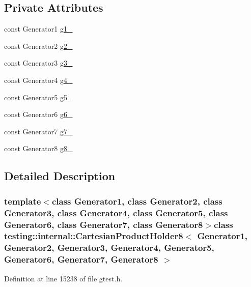 \subsection*{\-Private \-Attributes}
\begin{DoxyCompactItemize}
\item 
const \-Generator1 \hyperlink{classtesting_1_1internal_1_1CartesianProductHolder8_a36a04c8f9e515291d6a093ab378084f7}{g1\-\_\-}
\item 
const \-Generator2 \hyperlink{classtesting_1_1internal_1_1CartesianProductHolder8_a6cfd9fa9a396d07747d5ebb1f05c7f22}{g2\-\_\-}
\item 
const \-Generator3 \hyperlink{classtesting_1_1internal_1_1CartesianProductHolder8_a79088ad1a5d8e0e316bd20057b9cfb3f}{g3\-\_\-}
\item 
const \-Generator4 \hyperlink{classtesting_1_1internal_1_1CartesianProductHolder8_afdb77af6126bc058715b1304ec0cc727}{g4\-\_\-}
\item 
const \-Generator5 \hyperlink{classtesting_1_1internal_1_1CartesianProductHolder8_ac153ca256cc6aabca132e9276e0b7e80}{g5\-\_\-}
\item 
const \-Generator6 \hyperlink{classtesting_1_1internal_1_1CartesianProductHolder8_ac5367ac6ea4b99933483d6181bace5c2}{g6\-\_\-}
\item 
const \-Generator7 \hyperlink{classtesting_1_1internal_1_1CartesianProductHolder8_afceade55d34273936f6cb3d7e4833d1b}{g7\-\_\-}
\item 
const \-Generator8 \hyperlink{classtesting_1_1internal_1_1CartesianProductHolder8_a33efc612232313b29b814adcffee62e6}{g8\-\_\-}
\end{DoxyCompactItemize}


\subsection{\-Detailed \-Description}
\subsubsection*{template$<$class Generator1, class Generator2, class Generator3, class Generator4, class Generator5, class Generator6, class Generator7, class Generator8$>$class testing\-::internal\-::\-Cartesian\-Product\-Holder8$<$ Generator1, Generator2, Generator3, Generator4, Generator5, Generator6, Generator7, Generator8 $>$}



\-Definition at line 15238 of file gtest.\-h.



